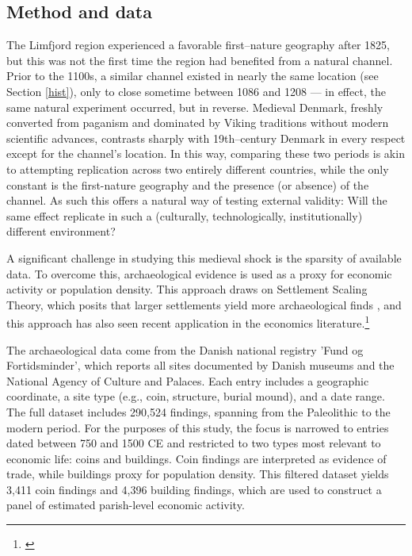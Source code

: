 \documentclass[12pt]{article}
\begin{document}
\subsection{Method and data}
The Limfjord region experienced a favorable first–nature geography after 1825, but this was not the first time the region had benefited from a natural channel. Prior to the 1100s, a similar channel existed in nearly the same location (see Section \ref{hist}), only to close sometime between 1086 and 1208 — in effect, the same natural experiment occurred, but in reverse. Medieval Denmark, freshly converted from paganism and dominated by Viking traditions without modern scientific advances, contrasts sharply with 19th–century Denmark in every respect except for the channel’s location. In this way, comparing these two periods is akin to attempting replication across two entirely different countries, while the only constant is the first-nature geography and the presence (or absence) of the channel. As such this offers a natural way of testing external validity: Will the same effect replicate in such a (culturally, technologically, institutionally) different environment?

A significant challenge in studying this medieval shock is the sparsity of available data. To overcome this, archaeological evidence is used as a proxy for economic activity or population density. This approach draws on Settlement Scaling Theory, which posits that larger settlements yield more archaeological finds \citep{Ortman2020}, and this approach has also seen recent application in the economics literature.\footnote{\cite{Davis2002, Bakker2021Phonecians, Allen2023, Barjamovic2019}} 

The archaeological data come from the Danish national registry 'Fund og Fortidsminder', which reports all sites documented by Danish museums and the National Agency of Culture and Palaces. Each entry includes a geographic coordinate, a site type (e.g., coin, structure, burial mound), and a date range. The full dataset includes 290,524 findings, spanning from the Paleolithic to the modern period. For the purposes of this study, the focus is narrowed to entries dated between 750 and 1500 CE and restricted to two types most relevant to economic life: coins and buildings. Coin findings are interpreted as evidence of trade, while buildings proxy for population density. This filtered dataset yields 3,411 coin findings and 4,396 building findings, which are used to construct a panel of estimated parish-level economic activity.
\end{document}
